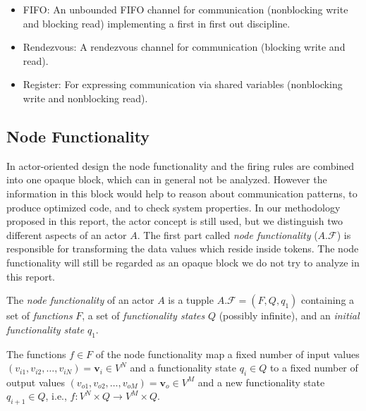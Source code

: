 \begin{itemize}
\item \label{channel-kind-fifo} FIFO:
  An unbounded FIFO channel for communication
  (nonblocking write and blocking read) implementing
  a first in first out discipline.

\item \label{channel-kind-rendezvous} Rendezvous:
  A rendezvous channel for communication %
  (blocking write and read).

\item \label{channel-kind-register} Register:
  For expressing communication via shared variables
  (nonblocking write and nonblocking read).
\end{itemize}

\subsection{Node Functionality}\label{node-functionality}

In actor-oriented design the node functionality and the firing rules
are combined into one opaque block, which can in general not be analyzed.
However the information in this block would help to reason about communication
patterns, to produce optimized code, and to check system properties.
In our methodology proposed in this report, the actor concept is still used,
but we distinguish two different aspects of an actor $A$. The first part called
\emph{node functionality} ($A.\mathcal{F}$) is responsible for transforming the data values
which reside inside tokens. The node functionality will still be regarded as
an opaque block we do not try to analyze in this report.

\begin{definition}\label{node-functionality}
  The \emph{node functionality} of an actor $A$ is a tupple $A.\mathcal{F} = (F,Q,q_1)$
  containing a set of \emph{functions} $F$, a set of \emph{functionality states} $Q$
  (possibly infinite), and an \emph{initial functionality state} $q_1$.
\end{definition}

The functions $f \in F$ of the node functionality map a fixed number of
input values $(v_{i1},v_{i2},\ldots,v_{iN}) = \mathbf{v}_i \in V^N$
and a functionality state $q_i \in Q$ to a fixed number of output values
$(v_{o1},v_{o2},\ldots,v_{oM}) = \mathbf{v}_o \in V^M$ and a new
functionality state $q_{i+1} \in Q$, i.e.,  $f: V^N \times Q \to V^M \times Q$.

